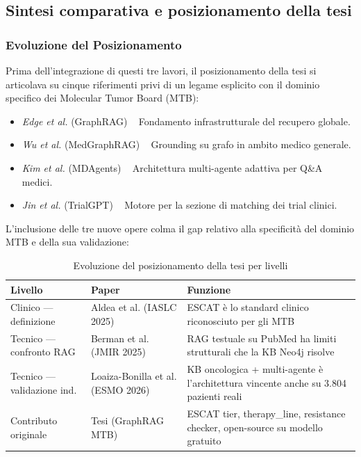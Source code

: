 \documentclass[11pt,a4paper]{article}
\renewcommand{\arraystretch}{1.25}
\newcommand{\pa}{\,\textcolor{secondary}{\textrightarrow}\,}
\begin{document}
\subsection{Sintesi comparativa e posizionamento della tesi}

\subsubsection*{Evoluzione del Posizionamento}
Prima dell'integrazione di questi tre lavori, il posizionamento della tesi si articolava su cinque riferimenti privi di un legame esplicito con il dominio specifico dei Molecular Tumor Board (MTB):
\begin{itemize}
  \item \emph{Edge et al.} (GraphRAG) \pa\ Fondamento infrastrutturale del recupero globale.
  \item \emph{Wu et al.} (MedGraphRAG) \pa\ Grounding su grafo in ambito medico generale.
  \item \emph{Kim et al.} (MDAgents) \pa\ Architettura multi-agente adattiva per Q\&A medici.
  \item \emph{Jin et al.} (TrialGPT) \pa\ Motore per la sezione di matching dei trial clinici.
\end{itemize}

L'inclusione delle tre nuove opere colma il gap relativo alla specificità del dominio MTB e della sua validazione:

\begin{table}[htbp]
\centering
\small
\renewcommand{\arraystretch}{1.3}
\caption{Evoluzione del posizionamento della tesi per livelli}
\label{tab:posizionamento}
\begin{tabularx}{\textwidth}{>{\raggedright\arraybackslash}p{4cm} >{\raggedright\arraybackslash}p{4cm} >{\raggedright\arraybackslash}X}
\toprule
\rowcolor{primary}
\color{white}\textbf{Livello} & \color{white}\textbf{Paper} & \color{white}\textbf{Funzione} \\
\midrule
Clinico --- definizione & Aldea et al. (IASLC 2025) & ESCAT è lo standard clinico riconosciuto per gli MTB \\
\rowcolor{roweven}
Tecnico --- confronto RAG & Berman et al. (JMIR 2025) & RAG testuale su PubMed ha limiti strutturali che la KB Neo4j risolve \\
Tecnico --- validazione ind. & Loaiza-Bonilla et al. (ESMO 2026) & KB oncologica + multi-agente è l'architettura vincente anche su 3.804 pazienti reali \\
\rowcolor{roweven}
Contributo originale & Tesi (GraphRAG MTB) & ESCAT tier, therapy\_line, resistance checker, open-source su modello gratuito \\
\bottomrule
\end{tabularx}
\end{table}
\end{document}
